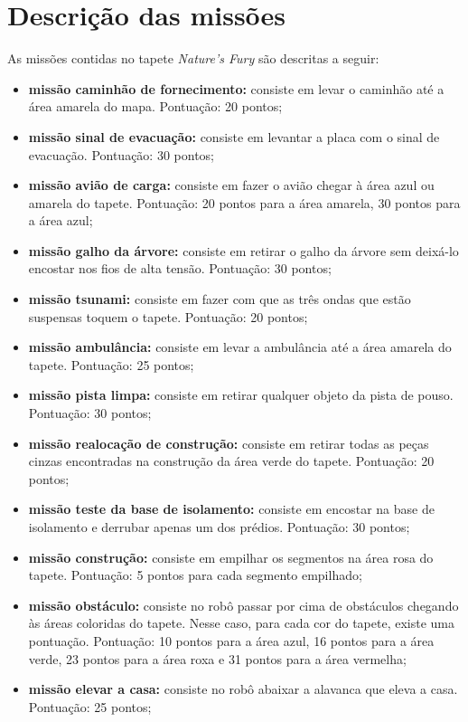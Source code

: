 \section{Descrição das missões}
As missões contidas no tapete \textit{Nature's Fury} \cite{challengeFury} são descritas a seguir:
\begin{itemize}
\item \textbf{missão caminhão de fornecimento:} consiste em levar o caminhão até a área amarela do mapa. Pontuação: 20 pontos;
\item \textbf{missão sinal de evacuação:} consiste em levantar a placa com o sinal de evacuação. Pontuação: 30 pontos;
\item \textbf{missão avião de carga:} consiste em fazer o avião chegar à área azul ou amarela do tapete. Pontuação: 20 pontos para a área amarela, 30 pontos para a área azul;
\item \textbf{missão galho da árvore:} consiste em retirar o galho da árvore sem deixá-lo encostar nos fios de alta tensão. Pontuação: 30 pontos;
\item \textbf{missão tsunami:} consiste em fazer com que as três ondas que estão suspensas toquem o tapete. Pontuação: 20 pontos;
\item \textbf{missão ambulância:} consiste em levar a ambulância até a área amarela do tapete. Pontuação: 25 pontos;
\item \textbf{missão pista limpa:} consiste em retirar qualquer objeto da pista de pouso. Pontuação: 30 pontos;
\item \textbf{missão realocação de construção:} consiste em retirar todas as peças cinzas encontradas na construção da área verde do tapete. Pontuação: 20 pontos;
\item \textbf{missão teste da base de isolamento:} consiste em encostar na base de isolamento e derrubar apenas um dos prédios. Pontuação: 30 pontos;
\item \textbf{missão construção:} consiste em empilhar os segmentos na área rosa do tapete. Pontuação: 5 pontos para cada segmento empilhado;
\item \textbf{missão obstáculo:} consiste no robô passar por cima de obstáculos chegando às áreas coloridas do tapete. Nesse caso, para cada cor do tapete, existe uma pontuação. Pontuação: 10 pontos para a área azul, 16 pontos para a área verde, 23 pontos para a área roxa e 31 pontos para a área vermelha;	
\item \textbf{missão elevar a casa:} consiste no robô abaixar a alavanca que eleva a casa. Pontuação: 25 pontos;

\end{itemize}
